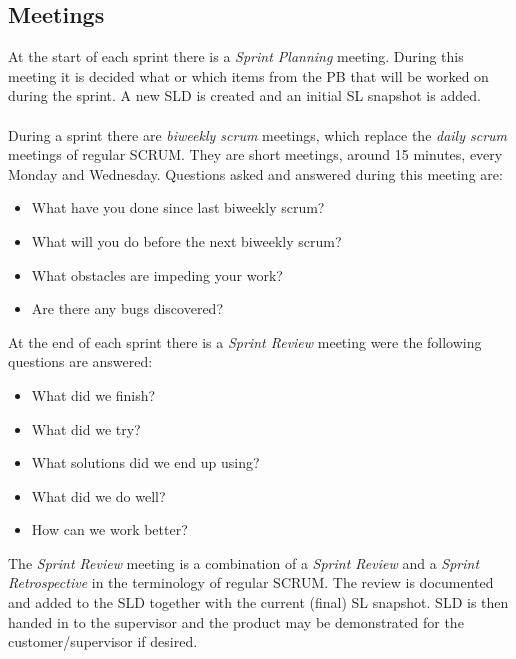 \newpage
\subsection{Meetings}
At the start of each sprint there is a \emph{Sprint Planning} meeting. During this meeting it is decided what or which items from the PB that will be worked on during the sprint. A new SLD is created and an initial SL snapshot is added.\\
\\
During a sprint there are \emph{biweekly scrum} meetings, which replace the \emph{daily scrum} meetings of regular SCRUM. They are short meetings, around 15 minutes, every Monday and Wednesday. Questions asked and answered during this meeting are:
\begin{itemize}
  \item What have you done since last biweekly scrum?
  \item What will you do before the next biweekly scrum?
  \item What obstacles are impeding your work?
  \item Are there any bugs discovered?
\end{itemize}
\vspace{4mm}
At the end of each sprint there is a \emph{Sprint Review} meeting were the following questions are answered:
\begin{itemize}
  \item What did we finish? 
  \item What did we try?
  \item What solutions did we end up using?
  \item What did we do well?
  \item How can we work better?
\end{itemize}
The \emph{Sprint Review} meeting is a combination of a \emph{Sprint Review} and a \emph{Sprint Retrospective} in the terminology of regular SCRUM. The review is documented and added to the SLD together with the current (final) SL snapshot. SLD is then handed in to the supervisor and the product may be demonstrated for the customer/supervisor if desired.
